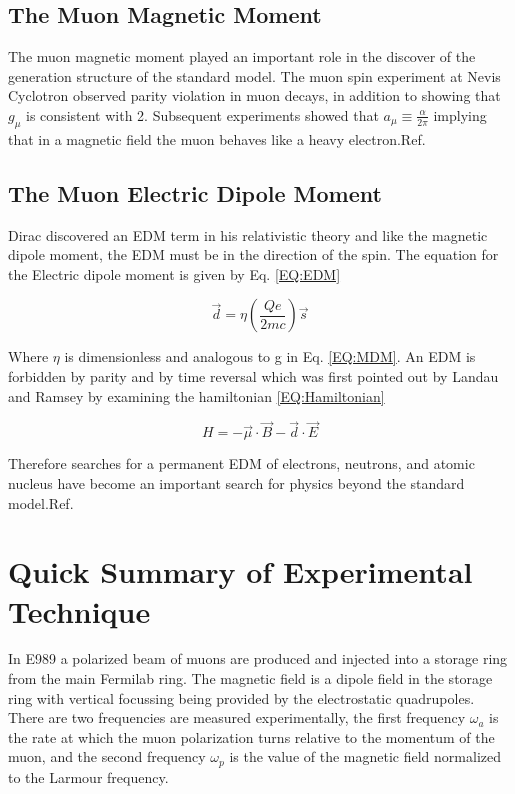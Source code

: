 \documentclass[./Thesis]{subfiles}
\begin{document}
\subsection{The Muon Magnetic Moment}

	The muon magnetic moment played an important role in the discover of the generation structure of the standard model. The muon spin experiment at Nevis Cyclotron observed parity violation in muon decays, in addition to showing that $g_\mu$ is consistent with 2. Subsequent experiments showed that $a_\mu \equiv \frac{\alpha}{2\pi} $ implying that in a magnetic field the muon behaves like a heavy electron.Ref. \cite{TDR}


\subsection{The Muon Electric Dipole Moment}


	Dirac discovered an EDM term in his relativistic theory and like the magnetic dipole moment, the EDM must be in the direction of the spin. The equation for the Electric dipole moment is given by Eq. \ref{EQ:EDM}
	
	\begin{equation}\label{EQ:EDM}
		\vec{d} = \eta (\frac{Qe}{2mc}) \vec{s}
	\end{equation}

	Where $\eta$ is dimensionless and analogous to g in Eq. \ref{EQ:MDM}. An EDM is forbidden by parity and by time reversal which was first pointed out by Landau and Ramsey by examining the hamiltonian \ref{EQ:Hamiltonian}
	
	\begin{equation}\label{EQ:Hamiltonian}
	H = -\vec{\mu} \cdot \vec{B} - \vec{d} \cdot \vec{E}
	\end{equation}
	
Therefore searches for a permanent EDM of electrons, neutrons, and atomic nucleus have become an important search for physics beyond the standard model.Ref. \cite{TDR}

\section{Quick Summary of Experimental Technique}

	In E989 a polarized beam of muons are produced and injected into a storage ring from the main Fermilab ring. The magnetic field is a dipole field in the storage ring with vertical focussing being provided by the electrostatic quadrupoles. There are two frequencies are measured experimentally, the first frequency $\omega_{a}$ is the rate at which the muon polarization turns relative to the momentum of the muon, and the second frequency $\omega_p$ is the value of the magnetic field normalized to the Larmour frequency.
	
\end{document}
